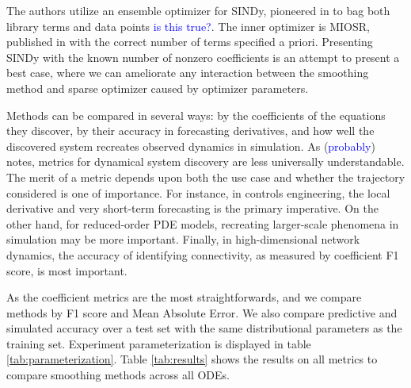 \documentclass{article}
\newcommand{\blue}[1]{\textcolor{blue}{#1}}
\begin{document}
The authors utilize an ensemble optimizer for SINDy, pioneered in \cite{Fasel2022} to bag both library terms and data points \blue{is this true?}.  The inner optimizer is MIOSR, published in \cite{Bertsimas2022} with the correct number of terms specified a priori.  Presenting SINDy with the known number of nonzero coefficients is an attempt to present a best case, where we can ameliorate any interaction between the smoothing method and sparse optimizer caused by optimizer parameters.

Methods can be compared in several ways: by the coefficients of the equations they discover, by their accuracy in forecasting derivatives, and how well the discovered system recreates observed dynamics in simulation.  As \cite{Gilpin2023} (\blue{probably}) notes,  metrics for dynamical system discovery are less universally understandable.  The merit of a metric depends upon both the use case and whether the trajectory considered is one of importance.  For instance, in controls engineering, the local derivative and very short-term forecasting is the primary imperative.  On the other hand, for reduced-order PDE models, recreating larger-scale phenomena in simulation may be more important.  Finally, in high-dimensional network dynamics, the accuracy of identifying connectivity, as measured by coefficient F1 score, is most important.

\begin{table}
    \label{tab:parameterization}
\end{table}
As the coefficient metrics are the most straightforwards, and we compare methods by F1 score and Mean Absolute Error.  We also compare predictive and simulated accuracy over a test set with the same distributional parameters as the training set.  Experiment parameterization is displayed in table \ref{tab:parameterization}.  Table \ref{tab:results} shows the results on all metrics to compare smoothing methods across all ODEs.
\begin{table}
    \label{tab:results}
\end{table}
\end{document}
